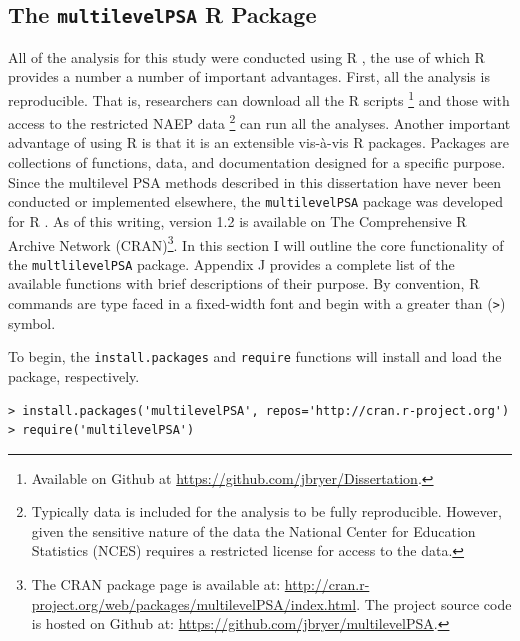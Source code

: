 \documentclass[letterpaper,12p,twoside]{article} %
\begin{document}

\subsection{The \texttt{multilevelPSA} R Package}

All of the analysis for this study were conducted using R \cite{rdevelopment}, the use of which R provides a number a number of important advantages. First, all the analysis is reproducible. That is, researchers can download all the R scripts \footnote{Available on Github at \url{https://github.com/jbryer/Dissertation}.} and those with access to the restricted NAEP data \footnote{Typically data is included for the analysis to be fully reproducible. However, given the sensitive nature of the data the National Center for Education Statistics (NCES) requires a restricted license for access to the data.} can run all the analyses. Another important advantage of using R is that it is an extensible vis-à-vis R packages. Packages are collections of functions, data, and documentation designed for a specific purpose. Since the multilevel PSA methods described in this dissertation have never been conducted or implemented elsewhere, the \texttt{multilevelPSA} package was developed for R \cite{rdevelopment}. As of this writing, version 1.2 is available on The Comprehensive R Archive Network (CRAN)\footnote{The CRAN package page is available at: \url{http://cran.r-project.org/web/packages/multilevelPSA/index.html}. The project source code is hosted on Github at: \url{https://github.com/jbryer/multilevelPSA}.}. In this section I will outline the core functionality of the \texttt{multlilevelPSA} package. Appendix J provides a complete list of the available functions with brief descriptions of their purpose. By convention, R commands are type faced in a fixed-width font and begin with a greater than (\texttt{>}) symbol.

To begin, the \texttt{install.packages} and \texttt{require} functions will install and load the package, respectively.

\begin{verbatim}
> install.packages('multilevelPSA', repos='http://cran.r-project.org')
> require('multilevelPSA')
\end{verbatim}
\end{document}
